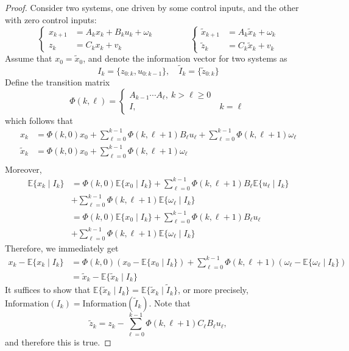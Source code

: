 \begin{proof}
Consider two systems, one driven by some control inputs,
and the other with zero control inputs:
\[
\left\{
\begin{aligned}
x_{k+1}&=A_kx_k+B_ku_k+\omega_k\\
z_k&=C_kx_k+v_k
\end{aligned}
\right.\qquad
\qquad
\left\{
\begin{aligned}
\tilde{x}_{k+1}&=A_k\tilde{x}_k+\omega_k\\
\tilde{z}_k&=C_k\tilde{x}_k+v_k
\end{aligned}
\right.
\]
Assume that $x_0=\tilde{x}_0$, and denote the information vector for two systems as 
\[
I_k=\{z_{0:k},u_{0:k-1}\},\quad
\tilde{I}_k=\{\tilde{z}_{0:k}\}
\]
Define the transition matrix
\[
\Phi(k,\ell)
=
\left\{
\begin{aligned}
A_{k-1}\cdots A_{\ell},\ k>\ell\ge0\\
I,&\ k=\ell
\end{aligned}
\right.
\]
which follows that
\begin{align*}
x_k&=
\Phi(k,0)x_0+\sum_{\ell=0}^{k-1}\Phi(k,\ell+1)B_{\ell}u_{\ell}+\sum_{\ell=0}^{k-1}\Phi(k,\ell+1)\omega_{\ell}\\
\tilde{x}_k&=
\Phi(k,0)x_0+\sum_{\ell=0}^{k-1}\Phi(k,\ell+1)\omega_{\ell}\\
\end{align*}
Moreover,
\begin{align*}
\mathbb{E}\{x_k\mid I_k\}&=
\Phi(k,0)\mathbb{E}\{x_0\mid I_k\}+\sum_{\ell=0}^{k-1}\Phi(k,\ell+1)B_{\ell}\mathbb{E}\{u_{\ell}\mid I_k\}\\&+\sum_{\ell=0}^{k-1}\Phi(k,\ell+1)\mathbb{E}\{\omega_{\ell}\mid I_k\}\\
&=
\Phi(k,0)\mathbb{E}\{x_0\mid I_k\}+\sum_{\ell=0}^{k-1}\Phi(k,\ell+1)B_{\ell}u_{\ell}\\&+\sum_{\ell=0}^{k-1}\Phi(k,\ell+1)\mathbb{E}\{\omega_{\ell}\mid I_k\}
\end{align*}
Therefore, we immediately get
\begin{align*}
x_k - \mathbb{E}\{x_k\mid I_k\}
&=
\Phi(k,0)(x_0-\mathbb{E}\{x_0\mid I_k\})
+\sum_{\ell=0}^{k-1}\Phi(k,\ell+1)(\omega_{\ell}-\mathbb{E}\{\omega_{\ell}\mid I_k\})\\
&=\tilde{x}_k - \mathbb{E}\{\tilde{x}_k\mid I_k\}
\end{align*}
It suffices to show that $\mathbb{E}\{\tilde{x}_k\mid I_k\}=\mathbb{E}\{\tilde{x}_k\mid \tilde{I}_k\}$, or more precisely,
$\text{Information}(I_k)=\text{Information}(\tilde{I}_k)$.
Note that
\[
\tilde{z}_k=z_k - \sum_{\ell=0}^{k-1}\Phi(k,\ell+1)C_{\ell}B_{\ell}u_{\ell},
\]
and therefore this is true.


\end{proof}
